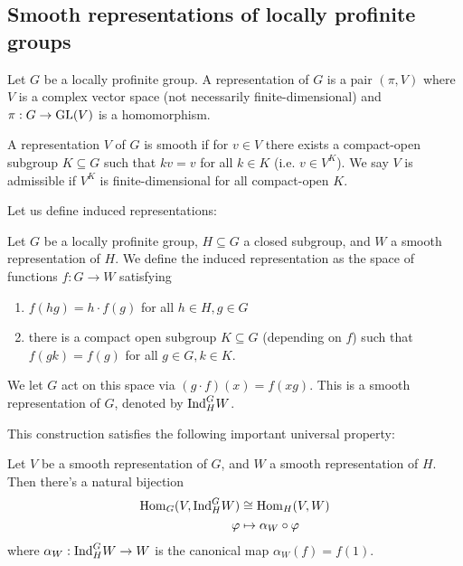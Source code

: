 \subsection{Smooth representations of locally profinite groups}

Let $G$ be a locally profinite group. A representation of $G$ is a pair $(\pi, V)$ where $V$ is a complex vector space (not necessarily finite-dimensional) and $\pi: G \to \mathrm{GL}(V)$ is a homomorphism.
\begin{defn}
	A representation $V$ of $G$ is smooth if for $v\in V$ there exists a compact-open subgroup $K\subseteq G$ such that $kv = v$ for all $k\in K$ (i.e. $v\in V^K$). We say $V$ is admissible if $V^K$ is finite-dimensional for all compact-open $K$.
\end{defn}

Let us define induced representations:
\begin{defn}\label{induction}
	Let $G$ be a locally profinite group, $H\subseteq G$ a closed subgroup, and $W$ a smooth representation of $H$. We define the induced representation as the space of functions $f: G\to W$ satisfying
	\begin{enumerate}
		\item $f(hg) = h\cdot f(g)$ for all $h\in H, g\in G$
		\item there is a compact open subgroup $K\subseteq G$ (depending on $f$) such that $f(gk) = f(g)$ for all $g\in G, k\in K$.
	\end{enumerate}
	We let $G$ act on this space via $(g\cdot f)(x) = f(xg)$. This is a smooth representation of $G$, denoted by $\mathrm{Ind}_H^G W$.
\end{defn}
This construction satisfies the following important universal property:
\begin{thm}
	Let $V$ be a smooth representation of $G$, and $W$ a smooth representation of $H$. Then there's a natural bijection
	\begin{align*}
		\mathrm{Hom}_G(V, \mathrm{Ind}_H^G W)&\cong \mathrm{Hom}_H(V, W)\\
		\varphi &\mapsto \alpha_W \circ \varphi
	\end{align*}
	where $\alpha_W: \mathrm{Ind}_H^G W \to W$ is the canonical map $\alpha_W(f) = f(1)$.
\end{thm}


